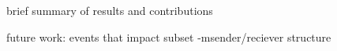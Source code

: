 \PP brief summary of results and contributions

future work: events that impact subset
-msender/reciever structure